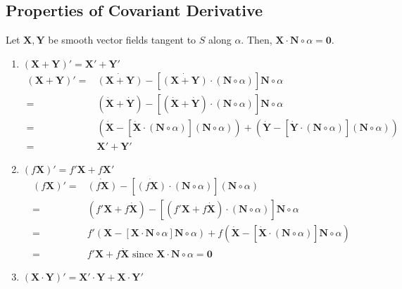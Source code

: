 \subsection{Properties of Covariant Derivative}
Let $\mathbf{X},\mathbf{Y}$ be smooth vector fields tangent to $S$ along $\alpha$. Then, $\mathbf{X} \cdot \mathbf{N} \circ \alpha = \mathbf{0}$.
\begin{enumerate}
	\item $(\mathbf{X}+\mathbf{Y})' = \mathbf{X}'+\mathbf{Y}'$\\
	\begin{align*}
		(\mathbf{X} + \mathbf{Y})' = & \dot{(\mathbf{X}+\mathbf{Y})} - [\dot{(\mathbf{X}+\mathbf{Y})} \cdot (\mathbf{N} \circ \alpha)] \mathbf{N} \circ \alpha \\
		= & (\dot{\mathbf{X}} + \dot{\mathbf{Y}}) - [(\dot{\mathbf{X}} + \dot{\mathbf{Y}}) \cdot (\mathbf{N} \circ \alpha)] \mathbf{N} \circ \alpha \\
		= & \left( \dot{\mathbf{X}} - \left[ \dot{\mathbf{X}} \cdot (\mathbf{N} \circ \alpha) \right] (\mathbf{N} \circ \alpha) \right) + \left( \dot{\mathbf{Y}} - \left[ \dot{\mathbf{Y}} \cdot (\mathbf{N} \circ \alpha) \right] (\mathbf{N} \circ \alpha) \right)\\
		= & \mathbf{X}' + \mathbf{Y}'
	\end{align*}
	\item $(f\mathbf{X})' = f'\mathbf{X} + f\mathbf{X}'$\\
	\begin{align*}
		(f\mathbf{X})' = & \dot{(f\mathbf{X})} - \left[ \dot{(f\mathbf{X})} \cdot (\mathbf{N} \circ \alpha) \right] (\mathbf{N} \circ \alpha) \\
		= & \left( f'\mathbf{X} + f\dot{\mathbf{X}} \right) - \left[ (f'\mathbf{X} + f\dot{\mathbf{X}}) \cdot (\mathbf{N}\circ\alpha) \right] \mathbf{N} \circ \alpha \\
		= & f'\left( \mathbf{X}-\left[ \mathbf{X} \cdot \mathbf{N} \circ \alpha \right] \mathbf{N} \circ \alpha \right) + f\left( \dot{\mathbf{X}} - \left[ \dot{\mathbf{X}} \cdot (\mathbf{N} \circ \alpha) \right] \mathbf{N} \circ \alpha \right) \\
		= & f'\mathbf{X} + f \dot{\mathbf{X}} \text{ since } \mathbf{X} \cdot \mathbf{N} \circ \alpha = \mathbf{0}
	\end{align*}
	\item $(\mathbf{X} \cdot \mathbf{Y})' = \mathbf{X}' \cdot \mathbf{Y} + \mathbf{X} \cdot \mathbf{Y}'$\\
	\begin{align*}

\end{align*}
\end{enumerate}
